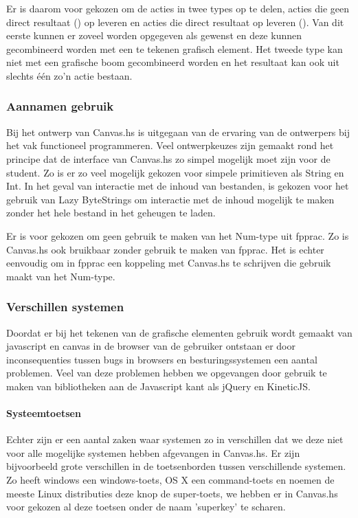 Er is daarom voor gekozen om de acties in twee types op te delen, acties die geen direct resultaat () op leveren en acties die direct resultaat op leveren (). Van dit eerste kunnen er zoveel worden opgegeven als gewenst en deze kunnen gecombineerd worden met een te tekenen grafisch element. Het tweede type kan niet met een grafische boom gecombineerd worden en het resultaat kan ook uit slechts één zo'n actie bestaan. 

\subsubsection{Aannamen gebruik}
Bij het ontwerp van Canvas.hs is uitgegaan van de ervaring van de ontwerpers bij het vak functioneel programmeren. Veel ontwerpkeuzes zijn gemaakt rond het principe dat de interface van Canvas.hs zo simpel mogelijk moet zijn voor de student. Zo is er zo veel mogelijk gekozen voor simpele primitieven als String en Int. In het geval van interactie met de inhoud van bestanden, is gekozen voor het gebruik van Lazy ByteStrings om interactie met de inhoud mogelijk te maken zonder het hele bestand in het geheugen te laden.

Er is voor gekozen om geen gebruik te maken van het Num-type uit fpprac. Zo is Canvas.hs ook bruikbaar zonder gebruik te maken van fpprac. Het is echter eenvoudig om in fpprac een koppeling met Canvas.hs te schrijven die gebruik maakt van het Num-type.

\subsubsection{Verschillen systemen}
Doordat er bij het tekenen van de grafische elementen gebruik wordt gemaakt van javascript en canvas in de browser van de gebruiker ontstaan er door inconsequenties tussen bugs in browsers en besturingssystemen een aantal problemen. Veel van deze problemen hebben we opgevangen door gebruik te maken van bibliotheken aan de Javascript kant als jQuery en KineticJS. 

\paragraph{Systeemtoetsen} Echter zijn er een aantal zaken waar systemen zo in verschillen dat we deze niet voor alle mogelijke systemen hebben afgevangen in Canvas.hs. Er zijn bijvoorbeeld grote verschillen in de toetsenborden tussen verschillende systemen. Zo heeft windows een windows-toets, OS X een command-toets en noemen de meeste Linux distributies deze knop de super-toets, we hebben er in Canvas.hs voor gekozen al deze toetsen onder de naam 'superkey' te scharen.
